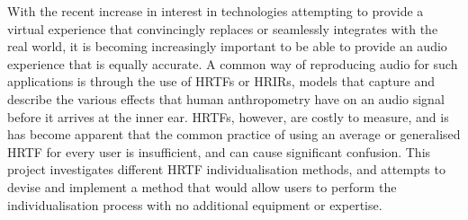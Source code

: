 With the recent increase in interest in technologies attempting to provide a virtual experience that convincingly replaces or seamlessly integrates with the real world, it is becoming increasingly important to be able to provide an audio experience that is equally accurate. A common way of reproducing audio for such applications is through the use of HRTFs or HRIRs, models that capture and describe the various effects that human anthropometry have on an audio signal before it arrives at the inner ear. HRTFs, however, are costly to measure, and is has become apparent that the common practice of using an average or generalised HRTF for every user is insufficient, and can cause significant confusion. This project investigates different HRTF individualisation methods, and attempts to devise and implement a method that would allow users to perform the individualisation process with no additional equipment or expertise. 